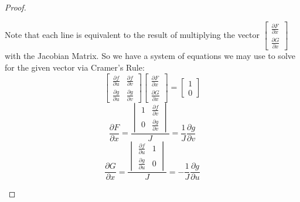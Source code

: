\documentclass[12pt]{article}
\newcommand{\partialD}[2]{\frac{\partial #1}{\partial #2}}
\begin{document}
\begin{proof}
\begin{enumerate}
    Note that each line is equivalent to the result of multiplying the vector $\begin{bmatrix}\partialD{F}{x} \\ \partialD{G}{x} \end{bmatrix}$ with the Jacobian Matrix.
    So we have a system of equations we may use to solve for the given vector via Cramer's Rule:
    \[
        \begin{bmatrix}
            \frac{\partial f}{\partial u} & \frac{\partial f}{\partial v} \\
            \frac{\partial g}{\partial u} & \frac{\partial g}{\partial v} 
        \end{bmatrix}
        \begin{bmatrix}
           \partialD{F}{x} \\ \partialD{G}{x} 
        \end{bmatrix}
        =
        \begin{bmatrix}
           1 \\ 0 
        \end{bmatrix}
    \]
    \[
    \partialD{F}{x}=\frac{\begin{vmatrix}
       1 & \partialD{f}{v} \\ 0 & \partialD{g}{v} 
    \end{vmatrix}}{J}=
    \frac{1}{J}\partialD{g}{v}
    \]
    \[
    \partialD{G}{x}=\frac{\begin{vmatrix}
       \partialD{f}{u} & 1 \\ \partialD{g}{u} & 0  
    \end{vmatrix}}{J}=
    -\frac{1}{J}\partialD{g}{u}
    \]


\end{enumerate}
\end{proof}
\end{document}
